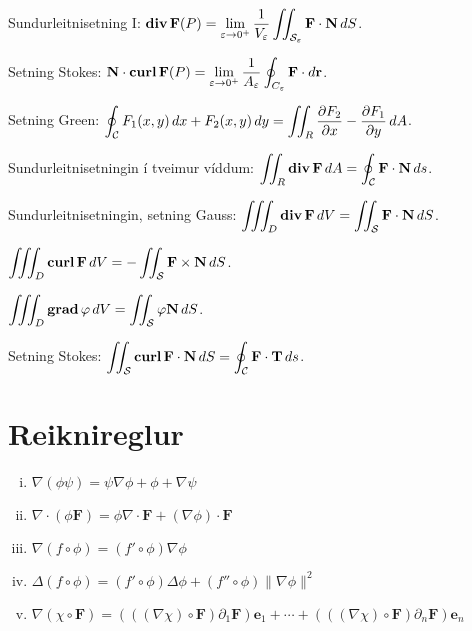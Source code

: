 Sundurleitnisetning I: 
$\displaystyle \mbox{${\rm\bf div\,}$}\mbox{${\bf F}$}(P)=\lim_{\varepsilon\rightarrow 0^+}
\frac{1}{V_\varepsilon}\int\!\!\!\int_{{\cal S}_\varepsilon}\mbox{${\bf F}$}\cdot\mbox{${\bf N}$}\,dS$.

Setning Stokes: 
$\displaystyle \mbox{${\bf N}$}\cdot\mbox{${\rm\bf curl\,}$}\mbox{${\bf F}$}(P)=\lim_{\varepsilon\rightarrow 0^+}
\frac{1}{A_\varepsilon}\oint_{C_\varepsilon}\mbox{${\bf F}$}\cdot d\mbox{${\bf r}$}$.

Setning Green: 
$\displaystyle \oint_{\cal C}F_1(x,y)\,dx+F_2(x,y)\,dy=\int\!\!\!\int_R
\frac{\partial  F_2}{\partial x}-
\frac{\partial  F_1}{\partial y}\,dA$.

Sundurleitnisetningin í tveimur víddum: 
$\displaystyle \int\!\!\!\int_R\mbox{${\rm\bf div\,}$}\mbox{${\bf F}$}\,dA=\oint_{\cal C} \mbox{${\bf F}$}\cdot\mbox{${\bf N}$}\,ds$.

Sundurleitnisetningin, setning Gauss: 
$\displaystyle \int\!\!\!\int\!\!\!\int_D \mbox{${\rm\bf div\,}$}\mbox{${\bf F}$}\,dV=\int\!\!\!\int_{\cal S} \mbox{${\bf F}$}\cdot\mbox{${\bf N}$}\,dS$. 

$\displaystyle \int\!\!\!\int\!\!\!\int_D\mbox{${\rm\bf curl\,}$}\mbox{${\bf F}$}\,dV=-\int\!\!\!\int_{\cal S}\mbox{${\bf F}$}\times\mbox{${\bf N}$}\,dS$.

$\displaystyle \int\!\!\!\int\!\!\!\int_D\mbox{${\rm\bf grad\,}$}\varphi\,dV=\int\!\!\!\int_{\cal S}\varphi\mbox{${\bf N}$}\,dS$.


Setning Stokes: 
$\displaystyle \int\!\!\!\int_{\cal S} \mbox{${\rm\bf curl\,}$}\mbox{${\bf F}$}\cdot\mbox{${\bf N}$}\,dS=\oint_{\cal C}\mbox{${\bf F}$}\cdot \mbox{${\bf T}$}\,ds$.

\newpage

\section*{Reiknireglur}
\begin{enumerate}[(i)]
	\item $\nabla(\phi\psi) = \psi\nabla \phi + \phi + \nabla\psi$
	\item $\nabla \cdot (\phi \mathbf F) = \phi \nabla \cdot \mathbf F 
		+(\nabla \phi)\cdot \mathbf F$
	\item $\nabla(f\circ \phi) = (f'\circ \phi)\nabla \phi$
	\item $\Delta(f\circ \phi) = (f'\circ \phi)\Delta \phi + 
		(f''\circ \phi)\|\nabla \phi\|^2$
	\item $\nabla(\chi \circ \mathbf F) = (((\nabla \chi)\circ \mathbf F)
		\partial_1\mathbf F) \mathbf e_1 + \cdots
		+ (((\nabla \chi)\circ \mathbf F)\partial _n \mathbf F)
		\mathbf e_n$
\end{enumerate}

